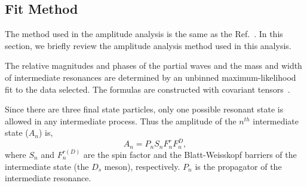 \subsection{Fit Method}
\par{The method used in the amplitude analysis is the same as the Ref.~\cite{Doc-DB-416-v30}. In this section, we briefly review the amplitude analysis method used in this analysis.
    
    The relative magnitudes and phases of the partial waves and the mass and width of intermediate resonances are determined by an unbinned maximum-likelihood fit to the data selected. The formulas are constructed with covariant tensors~\cite{covariant-tensors}.

    Since there are three final state particles, only one possible resonant state is allowed in any intermediate process. Thus the amplitude of the $n^{th}$ intermediate state ($A_{n}$) is,
    \begin{equation}
        A_{n} = P_{n}S_{n}F_{n}^{r}F_{n}^{D}, \label{base-amplitude}
    \end{equation}
    where $S_{n}$ and $F_{n}^{r(D)}$ are the spin factor and the Blatt-Weisskopf barriers of the intermediate state (the $D_{s}$ meson), respectively. $P_{n}$ is the propagator of the intermediate resonance. 

}
